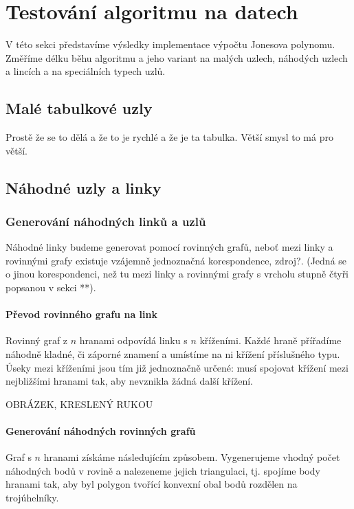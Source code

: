 
\chapter{Testování algoritmu na datech}

V této sekci představíme výsledky implementace výpočtu Jonesova polynomu. Změříme délku běhu algoritmu a jeho variant na malých uzlech, náhodých uzlech a lincích a na speciálních typech uzlů.

\section{Malé tabulkové uzly}

Prostě že se to dělá a že to je rychlé a že je ta tabulka. Větší smysl to má pro větší.
\section{Náhodné uzly a linky}

\subsection{Generování náhodných linků a uzlů}
Náhodné linky budeme generovat pomocí rovinných grafů, neboť mezi linky a rovinnými grafy existuje vzájemně jednoznačná korespondence, zdroj?. (Jedná se o jinou korespondenci,  než tu mezi linky a rovinnými grafy s vrcholu stupně čtyři popsanou v sekci **).

\subsubsection{Převod rovinného grafu na link}
Rovinný graf z $n$ hranami odpovídá linku s $n$ kříženími. Každé hraně přířadíme náhodně kladné, či záporné znamení a umístíme na ni křížení příslušného typu. Úseky mezi kříženími jsou tím již jednoznačně určené: musí spojovat křížení mezi nejbližšími hranami tak, aby nevznikla žádná další křížení.

OBRÁZEK, KRESLENÝ RUKOU

\subsubsection{Generování náhodných rovinných grafů}
Graf s $n$ hranami získáme následujícím způsobem. Vygenerujeme vhodný počet náhodných bodů v rovině a nalezeneme jejich triangulaci, tj. spojíme body hranami tak, aby byl polygon tvořící konvexní obal bodů rozdělen na trojúhelníky.

